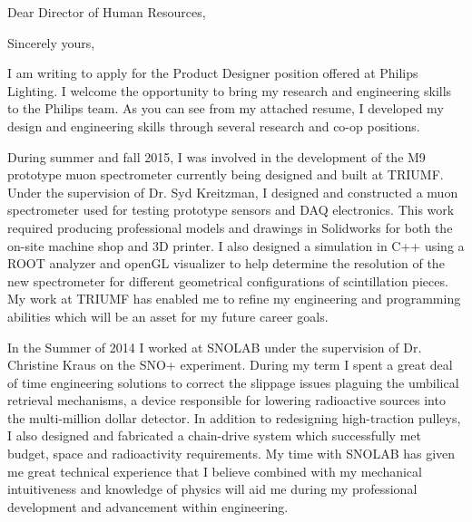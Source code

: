 \documentclass[11pt,a4paper]{moderncv} %
\begin{document}


\clearpage








\date{\today} %
\opening{Dear 
Director of Human Resources,} %
\closing{Sincerely yours,} %

\makelettertitle %
I am writing to apply for the Product Designer position offered at Philips Lighting. I welcome the opportunity to bring my research and engineering skills to the Philips team. As you can see from my attached resume, I developed my design and engineering skills through several research and co-op positions. 

During summer and fall 2015, I was involved in the development of the M9 prototype muon spectrometer currently being designed and built at TRIUMF. Under the supervision of Dr. Syd Kreitzman, I designed and constructed a muon spectrometer used for testing prototype sensors and DAQ electronics. This work required producing professional models and drawings in Solidworks for both the on-site machine shop and 3D printer. I also designed a simulation in C++ using a ROOT analyzer and openGL visualizer to help determine the resolution of the new spectrometer for different geometrical configurations of scintillation pieces. My work at TRIUMF has enabled me to refine my engineering and programming abilities which will be an asset for my future career goals. 

In the Summer of 2014 I worked at SNOLAB under the supervision of Dr. Christine Kraus on the SNO+ experiment. During my term I spent a great deal of time engineering solutions to correct the slippage issues plaguing the umbilical retrieval mechanisms, a device responsible for lowering radioactive sources into the multi-million dollar detector. In addition to redesigning high-traction pulleys, I also designed and fabricated a chain-drive system which successfully met budget, space and radioactivity requirements. My time with SNOLAB has given me great technical experience that I believe combined with my mechanical intuitiveness and knowledge of physics will aid me during my professional development and advancement within engineering.
\end{document}
